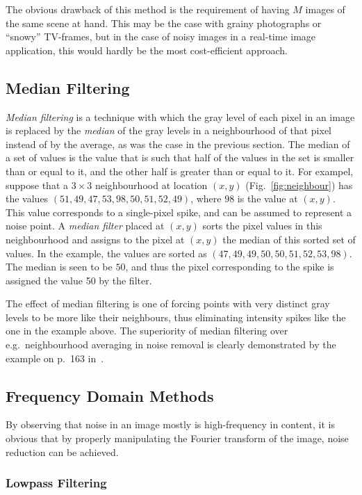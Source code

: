 The obvious drawback of this method is the requirement of having $M$
images of the same scene at hand.  This may be the case with grainy
photographs or ``snowy'' TV-frames, but in the case of noisy images in
a real-time image application, this would hardly be the most
cost-efficient approach.

\subsection{Median Filtering}
\label{image:noise:median}

{\em Median filtering\/} is a technique with which the gray level of
each pixel in an image is replaced by the {\em median\/} of the gray
levels in a neighbourhood of that pixel instead of by the average, as
was the case in the previous section.  The median of a set of values
is the value that is such that half of the values in the set is
smaller than or equal to it, and the other half is greater than or
equal to it.  For exampel, suppose that a $3\times 3$ neighbourhood at
location $(x,y)$ (Fig.~\ref{fig:neighbour}) has the values
$(51,49,47,53,98,50,51,52,49)$, where $98$ is the value at $(x,y)$.
This value corresponds to a single-pixel spike, and can be assumed to
represent a noise point.  A {\em median filter\/} placed at $(x,y)$
sorts the pixel values in this neighbourhood and assigns to the pixel
at $(x,y)$ the median of this sorted set of values.  In the example,
the values are sorted as $(47,49,49,50,50,51,52,53,98)$.  The median
is seen to be $50$, and thus the pixel corresponding to the spike is
assigned the value 50 by the filter.

The effect of median filtering is one of forcing points with very
distinct gray levels to be more like their neighbours, thus
eliminating intensity spikes like the one in the example above.  The
superiority of median filtering over e.g.\ neighbourhood averaging in
noise removal is clearly demonstrated by the example on p.\ 163
in~\cite{digim}.

\subsection{Frequency Domain Methods}
\label{image:noise:frequency}

By observing that noise in an image mostly is high-frequency in
content, it is obvious that by properly manipulating the Fourier
transform of the image, noise reduction can be achieved.

\subsubsection{Lowpass Filtering}

